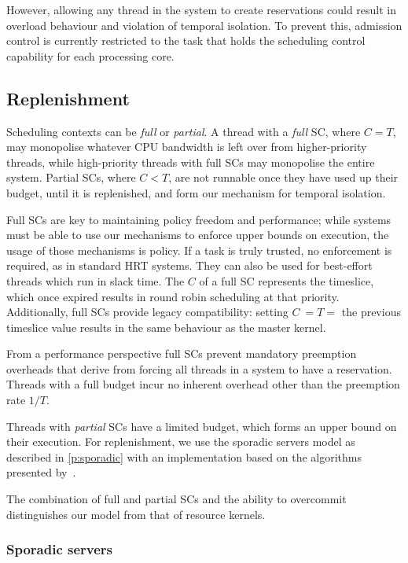 However, allowing any thread in the system to create reservations could result in overload behaviour and violation of temporal isolation.
To prevent this, admission control is currently restricted to the task that holds the scheduling
control capability for each processing core.

\subsection{Replenishment}

Scheduling contexts can be \emph{full} or \emph{partial}. A thread with a \emph{full} SC, where
\(C=T\), may monopolise whatever
CPU bandwidth is left over from higher-priority threads, while high-priority threads with full
\glspl{SC} may monopolise the entire system. 
Partial \glspl{SC}, where \(C<T\), are not runnable once
they have used up their budget, until it is replenished, and form our mechanism for temporal
isolation.  

Full \glspl{SC} are key to maintaining policy freedom and performance; while systems
must be able to use our mechanisms to enforce upper bounds on execution, the usage of 
those mechanisms is policy. If a task is truly trusted, no enforcement is required,
as in standard \gls{HRT} systems. They can also be used for best-effort threads which run in slack time.
The \(C\) of a full \gls{SC} represents the timeslice, which once expired results in round robin
scheduling at that priority. Additionally, full \glspl{SC} provide legacy compatibility: setting \(C\ = T =\)
the previous timeslice value results in the same behaviour as the master kernel. 

From a performance perspective full \glspl{SC} prevent mandatory preemption overheads 
that derive from forcing all threads in a system to have a reservation. Threads with a full
budget incur no inherent overhead other than the preemption rate $1/T$.

Threads with \emph{partial} \glspl{SC} have a limited budget, which forms an upper
bound on their execution. For replenishment, we
use the sporadic servers model as described in \cref{p:sporadic} with an
implementation based on the algorithms presented
by~\citet{Stanovic_BWH_10}. 

The combination of full and partial \glspl{SC}  and the ability to overcommit distinguishes our
model from that of resource kernels.

\subsubsection{Sporadic servers}
\label{sec:model-sporadic}


